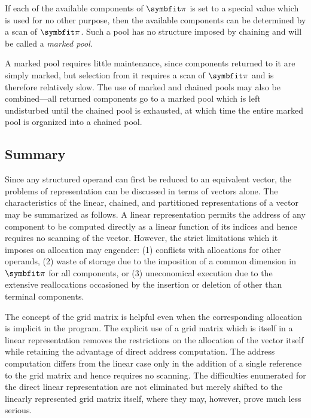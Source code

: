 \par If each of the available components of $\vect{\pi}$ is set to a special value which is used for no other purpose, then the available components can be determined by a scan of $\vect{\pi}$. Such a pool has no structure imposed by chaining and will be called a \textit{marked pool}.

\par A marked pool requires little maintenance, since components returned to it are simply marked, but selection from it requires a scan of $\vect{\pi}$ and is therefore relatively slow. The use of marked and chained pools may also be combined---all returned components go to a marked pool which is left undisturbed until the chained pool is exhausted, at which time the entire marked pool is organized into a chained pool.

\subsection*{Summary}

\par Since any structured operand can first be reduced to an equivalent vector, the problems of representation can be discussed in terms of vectors alone. The characteristics of the linear, chained, and partitioned representations of a vector may be summarized as follows. A linear representation permits the address of any component to be computed directly as a linear function of its indices and hence requires no scanning of the vector. However, the strict limitations which it imposes on allocation may engender: (1) conflicts with allocations for other operands, (2) waste of storage due to the imposition of a common dimension in $\vect{\pi}$ for all components, or (3) uneconomical execution due to the extensive reallocations occasioned by the insertion or deletion of other than terminal components.

\par The concept of the grid matrix is helpful even when the corresponding allocation is implicit in the program. The explicit use of a grid matrix which is itself in a linear representation removes the restrictions on the allocation of the vector itself while retaining the advantage of direct address computation. The address computation differs from the linear case only in the addition of a single reference to the grid matrix and hence requires no scanning. The difficulties enumerated for the direct linear representation are not eliminated but merely shifted to the linearly represented grid matrix itself, where they may, however, prove much less serious.

